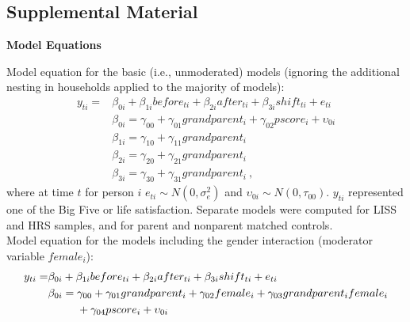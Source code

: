 \documentclass[
  english,
  man, noextraspace,floatsintext]{apa7}
\begin{document}
\begin{appendix}
\renewcommand{\appendixname}{\textcolor{white}{.}}

\hypertarget{supplemental-material}{%
\section{Supplemental Material}\label{supplemental-material}}

\renewcommand{\thefigure}{S\arabic{figure}} \setcounter{figure}{0}
\renewcommand{\thetable}{S\arabic{table}} \setcounter{table}{0}

\setcounter{page}{1}

\noindent \textbf{Model Equations}

Model equation for the basic (i.e., unmoderated) models (ignoring the
additional nesting in households applied to the majority of models):
\begin{equation}
\begin{split}
y_{ti} =& \beta_{0i} + \beta_{1i}before_{ti} + \beta_{2i}after_{ti} + \beta_{3i}shift_{ti} + e_{ti} \\
& \beta_{0i} = \gamma_{00} + \gamma_{01}grandparent_i + \gamma_{02}pscore_i + \upsilon_{0i} \\
& \beta_{1i} = \gamma_{10} + \gamma_{11}grandparent_i \\
& \beta_{2i} = \gamma_{20} + \gamma_{21}grandparent_i \\
& \beta_{3i} = \gamma_{30} + \gamma_{31}grandparent_i\ ,
\end{split}
\label{eq:mlm1}
\end{equation} where at time \(t\) for person \(i\)
\(e_{ti} \sim N(0, \sigma_e^2)\) and
\(\upsilon_{0i} \sim N(0, \tau_{00})\). \(y_{ti}\) represented one of
the Big Five or life satisfaction. Separate models were computed for
LISS and HRS samples, and for parent and nonparent matched controls.\\
Model equation for the models including the gender interaction
(moderator variable \(female_i\)): \begin{equation}
\begin{split}
y_{ti} =& \beta_{0i} + \beta_{1i}before_{ti} + \beta_{2i}after_{ti} + \beta_{3i}shift_{ti} + e_{ti} \\
& \beta_{0i} = \gamma_{00} + \gamma_{01}grandparent_i + \gamma_{02}female_i + \gamma_{03}grandparent_{i}female_{i} \\
& \hphantom{{}=\beta_{0i}}+ \gamma_{04}pscore_i + \upsilon_{0i} \\

\end{split}
\end{equation}
\end{appendix}
\end{document}
